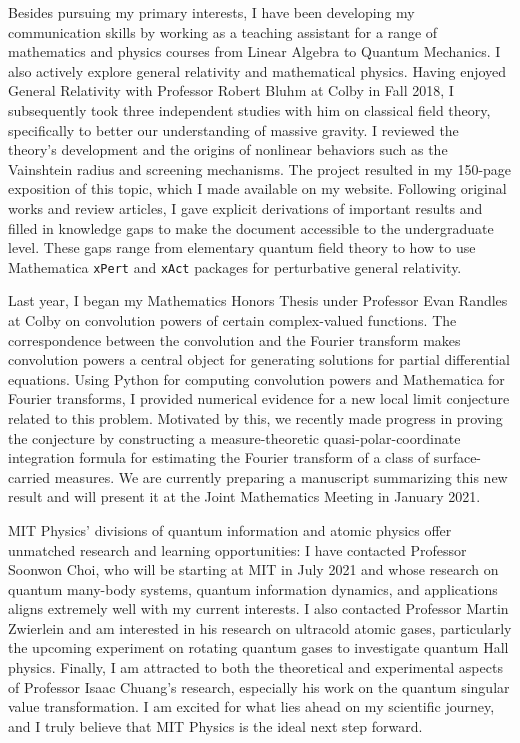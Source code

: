 \documentclass[12pt]{article}
\begin{document}
Besides pursuing my primary interests, I have been developing my communication skills by working as a teaching assistant for a range of mathematics and physics courses from Linear Algebra to Quantum Mechanics. I also actively explore general relativity and mathematical physics. Having enjoyed General Relativity with Professor Robert Bluhm at Colby in Fall 2018, I subsequently took three independent studies with him on classical field theory, specifically to better our understanding of massive gravity. I reviewed the theory's development and the origins of nonlinear behaviors such as the Vainshtein radius and screening mechanisms. The project resulted in my 150-page exposition of this topic, which I made available on my website. Following original works and review articles, I gave explicit derivations of important results and filled in knowledge gaps to make the document accessible to the undergraduate level. These gaps range from elementary quantum field theory to how to use Mathematica \texttt{xPert} and \texttt{xAct} packages for perturbative general relativity. \\ \vspace{-10pt}

Last year, I began my Mathematics Honors Thesis under Professor Evan Randles at Colby on convolution powers of certain complex-valued functions. The correspondence between the convolution and the Fourier transform makes convolution powers a central object for generating solutions for partial differential equations. Using Python for computing convolution powers and Mathematica for Fourier transforms, I provided numerical evidence for a new local limit conjecture related to this problem. Motivated by this, we recently made progress in proving the conjecture by constructing a measure-theoretic quasi-polar-coordinate integration formula for estimating the Fourier transform of a class of surface-carried measures. We are currently preparing a manuscript summarizing this new result and will present it at the Joint Mathematics Meeting in January 2021. \\ \vspace{-10pt}

MIT Physics' divisions of quantum information and atomic physics offer unmatched research and learning opportunities: I have contacted Professor Soonwon Choi, who will be starting at MIT in July 2021 and whose research on quantum many-body systems, quantum information dynamics, and applications aligns extremely well with my current interests. I also contacted Professor Martin Zwierlein and am interested in his research on ultracold atomic gases, particularly the upcoming experiment on rotating quantum gases to investigate quantum Hall physics. Finally, I am attracted to both the theoretical and experimental aspects of Professor Isaac Chuang's research, especially his work on the quantum singular value transformation. I am excited for what lies ahead on my scientific journey, and I truly believe that MIT Physics is the ideal next step forward.   \\ 
\end{document}

